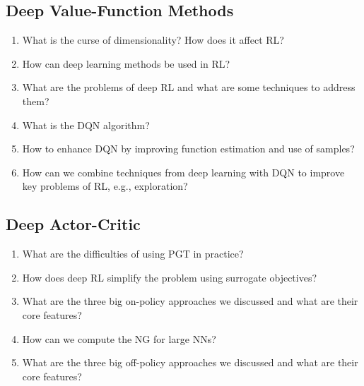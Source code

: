 		\subsection{Deep Value-Function Methods}
			\begin{enumerate}
				\item What is the curse of dimensionality? How does it affect \ac{RL}?
				\item How can deep learning methods be used in \ac{RL}?
				\item What are the problems of deep \ac{RL} and what are some techniques to address them?
				\item What is the \ac{DQN} algorithm?
				\item How to enhance \ac{DQN} by improving function estimation and use of samples?
				\item How can we combine techniques from deep learning with \ac{DQN} to improve key problems of \ac{RL}, e.g., exploration?
			\end{enumerate}

		\subsection{Deep Actor-Critic}
			\begin{enumerate}
				\item What are the difficulties of using \ac{PGT} in practice?
				\item How does deep \ac{RL} simplify the problem using surrogate objectives?
				\item What are the three big on-policy approaches we discussed and what are their core features?
				\item How can we compute the \ac{NG} for large \acp{NN}?
				\item What are the three big off-policy approaches we discussed and what are their core features?
			\end{enumerate}

